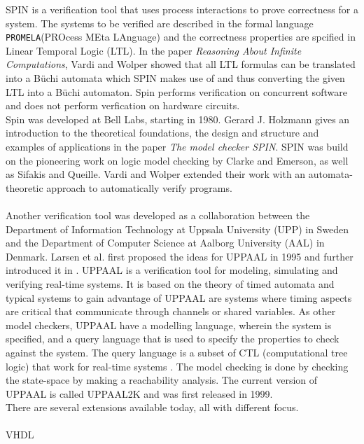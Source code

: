 \documentclass[a4paper]{report}
\begin{document}
SPIN\cite{spin} is a verification tool that uses process interactions to prove correctness for a system. The systems to be verified are described in the formal language \texttt{PROMELA}(PROcess MEta LAnguage)\cite{Holzmann1991} and the correctness properties are spcified in Linear Temporal Logic (LTL)\cite{Pnueli1977}. In the paper \textit{Reasoning About Infinite Computations}\cite{Vardi1994}, Vardi and Wolper showed that all LTL formulas can be translated into a B\"uchi automata which SPIN makes use of and thus converting the given LTL into a B\"uchi automaton. Spin performs verification on concurrent software and does not perform verfication on hardware circuits. \\
Spin was developed at Bell Labs, starting in 1980. Gerard J. Holzmann gives an introduction to the theoretical foundations, the design and structure and examples of applications in the paper \textit{The model checker SPIN}\cite{Holzmann1997}. SPIN was build on the pioneering work on logic model checking by Clarke and Emerson\cite{Clarke1981}, as well as Sifakis and Queille\cite{Queille1982}. Vardi and Wolper extended their work with an automata-theoretic approach to automatically verify programs\cite{Vardi1986}.\\\\

Another verification tool was developed as a collaboration between the Department of Information Technology at Uppsala University (UPP) in Sweden and the Department of Computer Science at Aalborg University (AAL) in Denmark. Larsen et al. first proposed the ideas for UPPAAL\cite{Larsen1995} in 1995 and further introduced it in \cite{Bengtsson1995}. 
UPPAAL\cite{uppaal} is a verification tool for modeling, simulating and verifying real-time systems.
It is based on the theory of timed automata\cite{Hopcroft2001}\cite{Alur1990} and typical systems to gain advantage of UPPAAL are systems where timing aspects are critical that communicate through channels or shared variables.
As other model checkers, UPPAAL have a modelling language, wherein the system is specified, and a query language that is used to specify the properties to check against the system. The query language is a subset of CTL (computational tree logic) that work for real-time systems\cite{Henzinger1994} \cite{Larsen1995}. The model checking is done by checking the state-space by making a reachability analysis. The current version of UPPAAL is called UPPAAL2K and was first released in 1999\cite{Amnell2001}.
\\
There are several extensions available today, all with different focus. \\\\
VHDL
\end{document}
